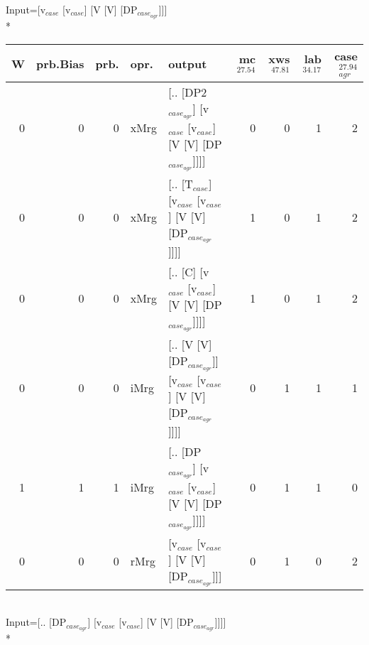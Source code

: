 \begingroup\scriptsize Input=[v$_{case}$ [v$_{case}$] [V [V] [DP$_{case_{agr}}$]]]\\*
\begin{tabularx}{\linewidth}{rrrlXrrrr}
\hline
   W &   prb.Bias &   prb. & opr.   & output                                                             &   mc$^{27.54}$ &   xws$^{47.81}$ &   lab$^{34.17}$ &   case$_{agr}^{27.94}$ \\
\hline
   0 &       0 &   0 & xMrg & [.. [DP2$_{case_{agr}}$] [v$_{case}$ [v$_{case}$] [V [V] [DP$_{case_{agr}}$]]]]        &            0 &             0 &             1 &                  2 \\
   0 &       0 &   0 & xMrg & [.. [T$_{case}$] [v$_{case}$ [v$_{case}$] [V [V] [DP$_{case_{agr}}$]]]]              &            1 &             0 &             1 &                  2 \\
   0 &       0 &   0 & xMrg & [.. [C] [v$_{case}$ [v$_{case}$] [V [V] [DP$_{case_{agr}}$]]]]                   &            1 &             0 &             1 &                  2 \\
   0 &       0 &   0 & iMrg & [.. [V [V] [DP$_{case_{agr}}$]] [v$_{case}$ [v$_{case}$] [V [V] [DP$_{case_{agr}}$]]]] &            0 &             1 &             1 &                  1 \\
   1 &       1 &   1 & iMrg & [.. [DP$_{case_{agr}}$] [v$_{case}$ [v$_{case}$] [V [V] [DP$_{case_{agr}}$]]]]         &            0 &             1 &             1 &                  0 \\
   0 &       0 &   0 & rMrg & [v$_{case}$ [v$_{case}$] [V [V] [DP$_{case_{agr}}$]]]                            &            0 &             1 &             0 &                  2 \\
\hline
\end{tabularx}\endgroup\\
\begingroup\scriptsize Input=[.. [DP$_{case_{agr}}$] [v$_{case}$ [v$_{case}$] [V [V] [DP$_{case_{agr}}$]]]]\\*
